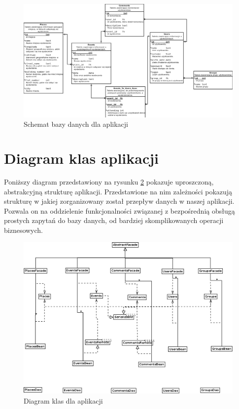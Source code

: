 \documentclass[a4paper]{article}
\begin{document}
\begin{figure}[!h]
\begin{center}
  \includegraphics[width=\textwidth]{baza.png}
  \caption{Schemat bazy danych dla aplikacji}
  \label{baza}
\end{center}
\end{figure}

\pagebreak
\section{Diagram klas aplikacji}
Poniższy diagram przedstawiony na rysunku \ref{klasy} pokazuje uproszczoną, abstrakcyjną strukturę aplikacji.
Przedstawione na nim zależności pokazują strukturę w jakiej zorganizowany został przepływ danych w naszej aplikacji.
Pozwala on na oddzielenie funkcjonalności związanej z bezpośrednią obsługą prostych zapytań do bazy danych, od bardziej skomplikowanych
operacji biznesowych.


\begin{figure}[!h]
\begin{center}
  \includegraphics[width=\textwidth]{classDiagram.png}
  \caption{Diagram klas dla aplikacji}
  \label{klasy}
\end{center}
\end{figure}


\begin{lstlisting}[caption={Kod pliku Screen.c}, label={sc}]
 
\end{lstlisting}
\end{document}
